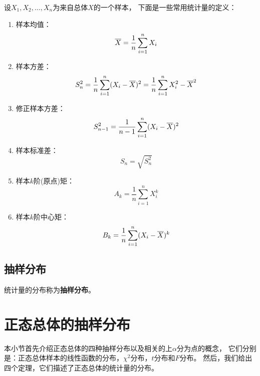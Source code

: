 \begin{definition}[常用统计量]
  设$X_1,X_2,\dots,X_n$为来自总体$X$的一个样本，
  下面是一些常用统计量的定义：
  \begin{enumerate}
    \item 样本均值：
    \begin{displaymath}
      \overline{X}=\frac{1}{n}\sum_{i=1}^{n}X_i
    \end{displaymath}
    \item 样本方差：
    \begin{displaymath}
      S_n^2 = \frac{1}{n}\sum_{i=1}^{n}(X_i-\overline{X})^2
      = \frac{1}{n}\sum_{i=1}^{n}X_i^2- \overline{X}^2
    \end{displaymath}
    \item 修正样本方差：
    \begin{displaymath}
      S_{n-1}^2 = \frac{1}{n-1}\sum_{i=1}^{n}(X_i-\overline{X})^2
    \end{displaymath}
    \item 样本标准差：
    \begin{displaymath}
      S_n = \sqrt{S_n^2}
    \end{displaymath}
    \item 样本$k$阶(原点)矩：
    \begin{displaymath}
      A_k = \frac{1}{n}\sum_{i=1}^{n}X_i^k
    \end{displaymath}
    \item 样本$k$阶中心矩：
    \begin{displaymath}
      B_k = \frac{1}{n}\sum_{i=1}^{n}(X_i-\overline{X})^k
    \end{displaymath}
  \end{enumerate}
\end{definition}

\subsection{抽样分布}
\begin{definition}[抽样分布]
  统计量的分布称为\textbf{抽样分布}。
\end{definition}

\section{正态总体的抽样分布}
本小节首先介绍正态总体的四种抽样分布以及相关的上$\alpha$分为点的概念，
它们分别是：正态总体样本的线性函数的分布，$\chi^2$分布，$t$分布和$F$分布。
然后，我们给出四个定理，它们描述了正态总体的统计量的分布。

